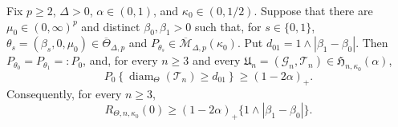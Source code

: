 Fix \(p\geq2\), \(\Delta>0\), \(\alpha\in(0,1)\), and \(\kappa_0\in(0,1/2)\). Suppose that there are \(\mu_0\in(0,\infty)^p\) and distinct \(\beta_0,\beta_1>0\) such that, for \(s\in\{0,1\}\), \(\theta_s=(\beta_s,0,\mu_0)\in\overline\Theta_{\Delta,p}\) and \(P_{\theta_s}\in\overline{\mathcal M}_{\Delta,p}(\kappa_0)\). Put \(d_{01}=1\wedge|\beta_1-\beta_0|\). Then \(P_{\theta_0}=P_{\theta_1}=:P_0\), and, for every \(n\geq3\) and every \(\mathfrak U_n=(\mathcal G_n,\mathcal T_n)\in\mathfrak H_{n,\kappa_0}(\alpha)\),
\[
 P_0\!\left\{\operatorname{diam}_{\Theta}(\mathcal T_n)\geq d_{01}\right\}
 \geq (1-2\alpha)_+ .
\]
Consequently, for every \(n\geq3\),
\[
 R_{\Theta,n,\kappa_0}(0)
 \geq (1-2\alpha)_+\{1\wedge|\beta_1-\beta_0|\}.
\]